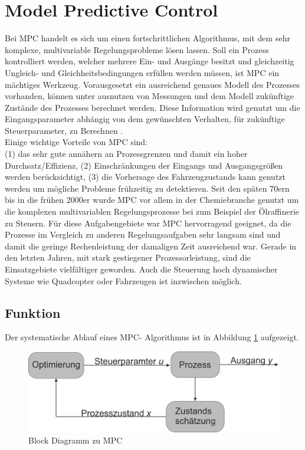 \documentclass{like}
\begin{document}
\section{Model Predictive Control}
Bei \ac{MPC} handelt es sich um einen fortschrittlichen Algorithmus, mit dem sehr komplexe, multivariable Regelungsprobleme lösen lassen. Soll ein Prozess kontrolliert werden, welcher mehrere Ein- und Ausgänge besitzt und gleichzeitig Ungleich- und Gleichheitsbedingungen erfüllen werden müssen, ist \acs{MPC} ein mächtiges Werkzeug. Vorausgesetzt ein ausreichend genaues Modell des Prozesses vorhanden, können unter ausnutzen von Messungen und dem Modell zukünftige Zustände des Prozesses berechnet werden. Diese Information wird genutzt um die Eingangsparameter abhängig von dem gewünschten Verhalten, für zukünftige Steuerparameter, zu Berechnen \cite{seborg2010process}. \\
Einige wichtige Vorteile von \ac{MPC} sind: \\
(1) das sehr gute annähern an Prozessgrenzen und damit ein hoher Durchsatz/Effizienz, (2) Einschränkungen der Eingangs und Ausgangsgrößen werden berücksichtigt, (3) die Vorhersage des Fahrzeugzustands kann genutzt werden um mögliche Probleme frühzeitig zu detektieren.
Seit den späten 70ern bis in die frühen 2000er wurde \ac{MPC} vor allem in der Chemiebranche genutzt um die komplexen multivariablen Regelungsprozesse bei zum Beispiel der Ölraffinerie zu Steuern. Für diese Aufgabengebiete war \acl{MPC} hervorragend geeignet, da die Prozesse im Vergleich zu anderen Regelungsaufgaben sehr langsam sind und damit die geringe Rechenleistung der damaligen Zeit ausreichend war. 
Gerade in den letzten Jahren, mit stark gestiegener Prozessorleistung, sind die Einsatzgebiete vielfältiger geworden. Auch die Steuerung hoch dynamischer Systeme wie Quadcopter \cite{quadcopterMpc} oder Fahrzeugen \cite{carMPC} ist inzwischen möglich. 

\subsection{Funktion}
Der systematische Ablauf eines \ac{MPC}- Algorithmus ist in Abbildung \ref{fig:mpcBlock} aufgezeigt.  

  \begin{figure}[ht!]
  	\centering
  	\includegraphics[width=350pt]{Abbildungen/mpcBlockDiagram.png}
  	\caption{Block Diagramm zu MPC}
  	\label{fig:mpcBlock}
  \end{figure}
\end{document}
